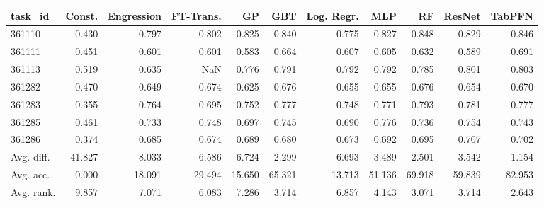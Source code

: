 \begin{tabular}{lrrrrrrrrrr}
\toprule
task\_id & Const. & Engression & FT-Trans. & GP & GBT & Log. Regr. & MLP & RF & ResNet & TabPFN \\
\midrule
361110 & 0.430 & 0.797 & 0.802 & 0.825 & 0.840 & 0.775 & 0.827 & 0.848 & 0.829 & 0.846 \\
361111 & 0.451 & 0.601 & 0.601 & 0.583 & 0.664 & 0.607 & 0.605 & 0.632 & 0.589 & 0.691 \\
361113 & 0.519 & 0.635 & NaN & 0.776 & 0.791 & 0.792 & 0.792 & 0.785 & 0.801 & 0.803 \\
361282 & 0.470 & 0.649 & 0.674 & 0.625 & 0.676 & 0.655 & 0.655 & 0.676 & 0.654 & 0.670 \\
361283 & 0.355 & 0.764 & 0.695 & 0.752 & 0.777 & 0.748 & 0.771 & 0.793 & 0.781 & 0.777 \\
361285 & 0.461 & 0.733 & 0.748 & 0.697 & 0.745 & 0.690 & 0.776 & 0.736 & 0.754 & 0.743 \\
361286 & 0.374 & 0.685 & 0.674 & 0.689 & 0.680 & 0.673 & 0.692 & 0.695 & 0.707 & 0.702 \\
Avg. diff. & 41.827 & 8.033 & 6.586 & 6.724 & 2.299 & 6.693 & 3.489 & 2.501 & 3.542 & 1.154 \\
Avg. acc. & 0.000 & 18.091 & 29.494 & 15.650 & 65.321 & 13.713 & 51.136 & 69.918 & 59.839 & 82.953 \\
Avg. rank. & 9.857 & 7.071 & 6.083 & 7.286 & 3.714 & 6.857 & 4.143 & 3.071 & 3.714 & 2.643 \\
\bottomrule
\end{tabular}
